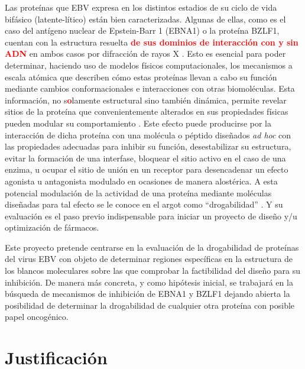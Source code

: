 \documentclass[11pt,letterpaper,titlepage]{article} %
\newcommand{\red}[1]{\textcolor{red}{\textbf{#1}}}
\newcommand{\tout}[1]{\red{\textst{#1}}}
\begin{document}
Las proteínas que EBV expresa en los distintos estadios de su ciclo de vida
bifásico (latente-lítico) están bien caracterizadas. Algunas de ellas, como es
el caso del antígeno nuclear de Epstein-Barr 1 (EBNA1) o la proteína BZLF1,
cuentan con la estructura resuelta \red{de sus dominios de interacción con y sin
  ADN } en ambos casos por difracción de rayos X \tout{ en su interacci\'on con
  ADN} \red{\cite{Bochkarev1995,Bochkarev1996c,Petosa2006}}. \tout{Esta
  informaci\'on} Esto es
esencial para poder determinar, haciendo uso de modelos físicos computacionales,
los mecanismos a escala atómica que describen cómo estas proteínas llevan a cabo
su función mediante cambios conformacionales e interacciones con otras
biomoléculas. Esta información, no s\red{o}lamente estructural sino también
dinámica, permite revelar sitios de la proteína que convenientemente alterados
en sus propiedades físicas pueden modular su comportamiento
\cite{Shirts2010a,Mortier2015}. Este efecto puede producirse por la
interacción de dicha proteína con una molécula o péptido diseñados \emph{ad hoc}
con las propiedades adecuadas para inhibir su función, desestabilizar su
estructura, evitar la formación de una interfase, bloquear el sitio activo en el
caso de una enzima, u ocupar el sitio de unión en un receptor para desencadenar
un efecto agonista u antagonista modulado en ocasiones de manera alostérica. A
esta potencial modulación de la actividad de una proteína mediante moléculas
diseñadas para tal efecto se le conoce en el argot como ``drogabilidad'' \red{\cite{Barril2013}}. Y su
evaluación es el paso previo indispensable para iniciar un proyecto de diseño
y/u optimización de fármacos.

Este proyecto pretende centrarse en la evaluación de la drogabilidad de
proteínas del virus EBV con objeto de determinar regiones específicas en la
estructura de los blancos moleculares sobre las que comprobar la factibilidad del
diseño para su inhibición. De manera más concreta, y como hipótesis inicial, se
trabajará en la búsqueda de mecanismos de inhibición de EBNA1 y BZLF1 dejando
abierta la posibilidad de determinar la drogabilidad de cualquier otra proteína
con posible papel oncogénico.


\section{Justificación}
\end{document}
